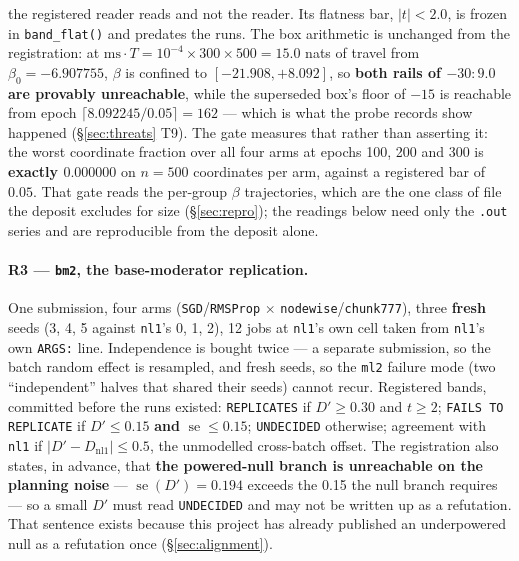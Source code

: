 \documentclass[10pt,letterpaper]{article}
\newcommand{\Dstat}{D}                         %
\newcommand{\arm}[1]{\texttt{#1}}
\DeclareMathOperator{\se}{se}
\begin{document}
the registered reader reads and not the reader. Its flatness bar, $|t| < 2.0$, is frozen in
\texttt{band\_flat()} and predates the runs. The box arithmetic is unchanged from the registration:
at $\text{ms}\cdot T = 10^{-4} \times 300 \times 500 = 15.0$ nats of travel from
$\beta_0 = -6.907755$, $\beta$ is confined to $[-21.908, +8.092]$, so \textbf{both rails of
$-30{:}9.0$ are provably unreachable}, while the superseded box's floor of $-15$ is reachable from
epoch $\lceil 8.092245 / 0.05 \rceil = 162$ --- which is what the probe records show happened
(\S\ref{sec:threats} T9). The gate measures that rather than asserting it: the worst coordinate
fraction over all four arms at epochs 100, 200 and 300 is \textbf{exactly $0.000000$} on $n = 500$
coordinates per arm, against a registered bar of $0.05$. That gate reads the per-group $\beta$
trajectories, which are the one class of file the deposit excludes for size
(\S\ref{sec:repro}); the readings below need only the \texttt{.out} series and are reproducible
from the deposit alone.

\paragraph{R3 --- \arm{bm2}, the base-moderator replication.}
One submission, four arms (\arm{SGD}/\arm{RMSProp} $\times$ \arm{nodewise}/\arm{chunk777}),
three \textbf{fresh} seeds (3, 4, 5 against \arm{nl1}'s 0, 1, 2), 12 jobs at \arm{nl1}'s own cell
taken from \arm{nl1}'s own \texttt{ARGS:} line. Independence is bought twice --- a separate
submission, so the batch random effect is resampled, and fresh seeds, so the \arm{ml2} failure
mode (two ``independent'' halves that shared their seeds) cannot recur. Registered bands,
committed before the runs existed: \texttt{REPLICATES} if $\Dstat' \ge 0.30$ and $t \ge 2$;
\texttt{FAILS TO REPLICATE} if $\Dstat' \le 0.15$ \textbf{and} $\se \le 0.15$;
\texttt{UNDECIDED} otherwise; agreement with \arm{nl1} if
$|\Dstat' - \Dstat_{\mathrm{nl1}}| \le 0.5$, the unmodelled cross-batch offset. The registration
also states, in advance, that \textbf{the powered-null branch is unreachable on the planning
noise} --- $\se(\Dstat') = 0.194$ exceeds the 0.15 the null branch requires --- so a small
$\Dstat'$ must read \texttt{UNDECIDED} and may not be written up as a refutation. That sentence
exists because this project has already published an underpowered null as a refutation once
(\S\ref{sec:alignment}).
\end{document}

